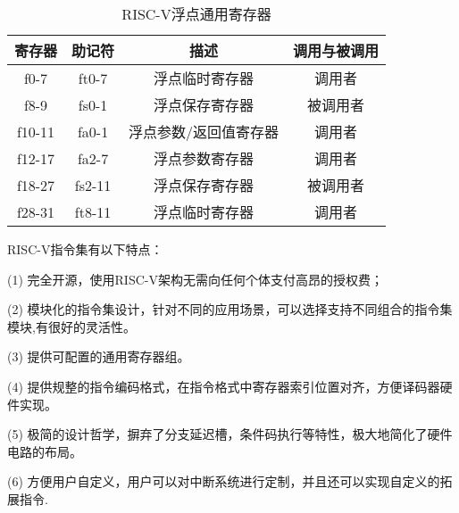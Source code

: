 \begin{table}[h]
  \centering
  \caption{RISC-V浮点通用寄存器}
  \label{tab:fpr}
  \begin{tabular}{cccc}
    \toprule
寄存器 &	助记符	& 描述 &	调用与被调用\\
    \midrule
    f0-7 & ft0-7 & 浮点临时寄存器 & 调用者\\
    f8-9 & fs0-1 & 浮点保存寄存器 & 被调用者\\
    f10-11 & fa0-1 & 浮点参数/返回值寄存器 & 调用者\\
    f12-17 & fa2-7 & 浮点参数寄存器 & 调用者\\
    f18-27 & fs2-11 & 浮点保存寄存器 & 被调用者\\
    f28-31 & ft8-11 & 浮点临时寄存器 & 调用者\\
    \bottomrule
  \end{tabular}
\end{table}


RISC-V指令集有以下特点：


(1) 完全开源，使用RISC-V架构无需向任何个体支付高昂的授权费；


(2) 模块化的指令集设计，针对不同的应用场景，可以选择支持不同组合的指令集模块,有很好的灵活性。


(3) 提供可配置的通用寄存器组。


(4) 提供规整的指令编码格式，在指令格式中寄存器索引位置对齐，方便译码器硬件实现。


(5) 极简的设计哲学，摒弃了分支延迟槽，条件码执行等特性，极大地简化了硬件电路的布局。


(6) 方便用户自定义，用户可以对中断系统进行定制，并且还可以实现自定义的拓展指令.
















